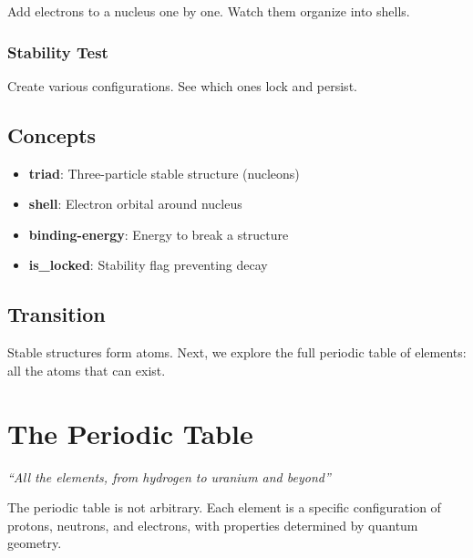 \documentclass[
  11pt,
  letterpaper,
  twoside,
  openright]{book}
\providecommand{\tightlist}{%
  \setlength{\itemsep}{0pt}\setlength{\parskip}{0pt}}
\begin{document}
Add electrons to a nucleus one by one. Watch them organize into shells.

\subsection{Stability Test}\label{stability-test}

Create various configurations. See which ones lock and persist.

\section{Concepts}\label{concepts}

\begin{itemize}
\tightlist
\item
  \textbf{triad}: Three-particle stable structure (nucleons)
\item
  \textbf{shell}: Electron orbital around nucleus
\item
  \textbf{binding-energy}: Energy to break a structure
\item
  \textbf{is\_locked}: Stability flag preventing decay
\end{itemize}

\section{Transition}\label{transition}

Stable structures form atoms. Next, we explore the full periodic table
of elements: all the atoms that can exist.

\chapter{The Periodic Table}\label{sec-periodic-table}

\emph{``All the elements, from hydrogen to uranium and beyond''}

\begin{tcolorbox}[enhanced jigsaw, leftrule=.75mm, title=\textcolor{quarto-callout-note-color}{\faInfo}\hspace{0.5em}{Key Revelation}, bottomrule=.15mm, opacityback=0, coltitle=black, arc=.35mm, colframe=quarto-callout-note-color-frame, colbacktitle=quarto-callout-note-color!10!white, colback=white, titlerule=0mm, breakable, bottomtitle=1mm, toptitle=1mm, rightrule=.15mm, toprule=.15mm, left=2mm, opacitybacktitle=0.6]

The periodic table is not arbitrary. Each element is a specific
configuration of protons, neutrons, and electrons, with properties
determined by quantum geometry.

\end{tcolorbox}
\end{document}
